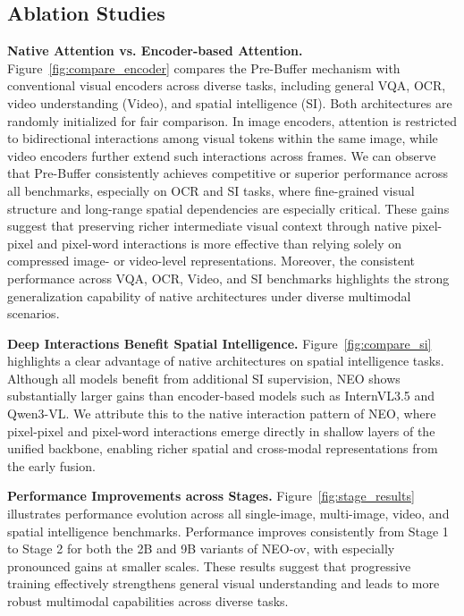 \documentclass[11pt]{article}
\begin{document}
\subsection{Ablation Studies}
\textbf{Native Attention vs. Encoder-based Attention.}
Figure~\ref{fig:compare_encoder} compares the Pre-Buffer mechanism with conventional visual encoders across diverse tasks, including general VQA, OCR, video understanding (Video), and spatial intelligence (SI). Both architectures are randomly initialized for fair comparison. In image encoders, attention is restricted to bidirectional interactions among visual tokens within the same image, while video encoders further extend such interactions across frames.
%
We can observe that Pre-Buffer consistently achieves competitive or superior performance across all benchmarks, especially on OCR and SI tasks, where fine-grained visual structure and long-range spatial dependencies are especially critical. These gains suggest that preserving richer intermediate visual context through native pixel-pixel and pixel-word interactions is more effective than relying solely on compressed image- or video-level representations. Moreover, the consistent performance across VQA, OCR, Video, and SI benchmarks highlights the strong generalization capability of native architectures under diverse multimodal scenarios.


\textbf{Deep Interactions Benefit Spatial Intelligence.}
Figure~\ref{fig:compare_si} highlights a clear advantage of native architectures on spatial intelligence tasks. Although all models benefit from additional SI supervision, NEO shows substantially larger gains than encoder-based models such as InternVL3.5 and Qwen3-VL. We attribute this to the native interaction pattern of NEO, where pixel-pixel and pixel-word interactions emerge directly in shallow layers of the unified backbone, enabling richer spatial and cross-modal representations from the early fusion.


\textbf{Performance Improvements across Stages.}
Figure~\ref{fig:stage_results} illustrates performance evolution across all single-image, multi-image, video, and spatial intelligence benchmarks. Performance improves consistently from Stage 1 to Stage 2 for both the 2B and 9B variants of NEO-ov, with especially pronounced gains at smaller scales. These results suggest that progressive training effectively strengthens general visual understanding and leads to more robust multimodal capabilities across diverse tasks.
\end{document}
